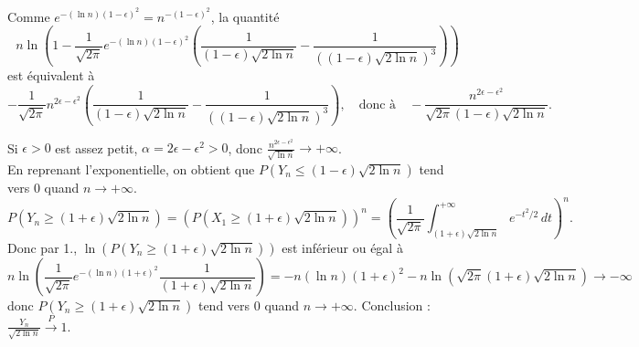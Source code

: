 {\begin{enumerate}
{Comme $e^{-(\ln n)(1-\epsilon)^2}=n^{-(1-\epsilon)^2}$, la quantité
$$
n\ln\left(1-\frac{1}{\sqrt{2\pi}}e^{-(\ln n)(1-\epsilon)^2}
\left(\frac{1}{(1-\epsilon)\sqrt{2\ln n}}-\frac{1}{((1-\epsilon)\sqrt{2\ln n})^3}
\right)\right)$$ est équivalent à
$$-\frac{1}{\sqrt{2\pi}} n^{2\epsilon-\epsilon^2}
\left(\frac{1}{(1-\epsilon)\sqrt{2\ln n}}-\frac{1}{((1-\epsilon)\sqrt{2\ln n})^3}
\right),\quad \mbox{donc à}\quad \displaystyle -\frac{n^{2\epsilon-\epsilon^2}}{\sqrt{2\pi}(1-\epsilon)
\sqrt{2\ln n}} .$$

Si $\epsilon>0$ est assez petit, $\alpha=2\epsilon-\epsilon^2>0$, donc
$\displaystyle \frac{n^{2\epsilon-\epsilon^2}}{\sqrt{\ln n}}\to +\infty$. \\
En reprenant l'exponentielle, on obtient que
$P(Y_n\leq (1-\epsilon)\sqrt{2\ln n})$ tend vers $0$ quand $n\to +\infty$.
$$
P(Y_n\geq (1+\epsilon)\sqrt{2\ln n})=(P(X_1\geq (1+\epsilon)\sqrt{2\ln n}))^n
=\left(\frac{1}{\sqrt{2\pi}}\int_{(1+\epsilon)\sqrt{2\ln n}}^{+\infty}
e^{-t^2/2}\,dt\right)^n.$$ 
Donc par 1., 
$\displaystyle\ln (P(Y_n\geq (1+\epsilon)\sqrt{2\ln n}))$ est inférieur ou égal à
$$
n\ln\left(\frac{1}{\sqrt{2\pi}}e^{-(\ln n)(1+\epsilon)^2}\frac{1}{(1+\epsilon)
\sqrt{2\ln n}}\right)=-n (\ln n)(1+\epsilon)^2-n\ln(\sqrt{2\pi}(1+\epsilon)\sqrt{2\ln n})
\to -\infty$$
donc $\displaystyle P(Y_n\geq (1+\epsilon)\sqrt{2\ln n})$
tend vers $0$ quand $n\to +\infty$. Conclusion :
$\displaystyle\frac{Y_n}{\sqrt{2\ln n}}\stackrel{P}{\longrightarrow}1$.}
\end{enumerate}
}
